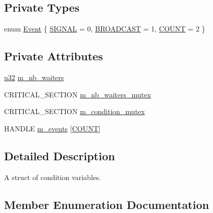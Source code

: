 \subsection*{Private Types}
\begin{DoxyCompactItemize}
\item 
enum \hyperlink{structmage_1_1_condition_variable_ae7627253bf4faebc0aae84a77920d195}{Event} \{ \hyperlink{structmage_1_1_condition_variable_ae7627253bf4faebc0aae84a77920d195a83361ddf52d1973875f7a48ac4bccf94}{S\+I\+G\+N\+AL} = 0, 
\hyperlink{structmage_1_1_condition_variable_ae7627253bf4faebc0aae84a77920d195a5863233d3c1e62ca806753b0d175199f}{B\+R\+O\+A\+D\+C\+A\+ST} = 1, 
\hyperlink{structmage_1_1_condition_variable_ae7627253bf4faebc0aae84a77920d195a553680ab09f088489b7d9f3cef9a5e14}{C\+O\+U\+NT} = 2
 \}
\end{DoxyCompactItemize}
\subsection*{Private Attributes}
\begin{DoxyCompactItemize}
\item 
\hyperlink{namespacemage_af2b398bf98eb10351f49cad73fe2cc73}{u32} \hyperlink{structmage_1_1_condition_variable_a3e707192c1372a21659df405867048eb}{m\+\_\+nb\+\_\+waiters}
\item 
C\+R\+I\+T\+I\+C\+A\+L\+\_\+\+S\+E\+C\+T\+I\+ON \hyperlink{structmage_1_1_condition_variable_a0686e682d62d44ff1eb9ac45acbb0eab}{m\+\_\+nb\+\_\+waiters\+\_\+mutex}
\item 
C\+R\+I\+T\+I\+C\+A\+L\+\_\+\+S\+E\+C\+T\+I\+ON \hyperlink{structmage_1_1_condition_variable_ab5ff870b2881a1979ccaec986d762441}{m\+\_\+condition\+\_\+mutex}
\item 
H\+A\+N\+D\+LE \hyperlink{structmage_1_1_condition_variable_a00691d5e29735da356f577bb5522017d}{m\+\_\+events} \mbox{[}\hyperlink{structmage_1_1_condition_variable_ae7627253bf4faebc0aae84a77920d195a553680ab09f088489b7d9f3cef9a5e14}{C\+O\+U\+NT}\mbox{]}
\end{DoxyCompactItemize}


\subsection{Detailed Description}
A struct of condition variables. 

\subsection{Member Enumeration Documentation}
\hypertarget{structmage_1_1_condition_variable_ae7627253bf4faebc0aae84a77920d195}{}\label{structmage_1_1_condition_variable_ae7627253bf4faebc0aae84a77920d195} 
